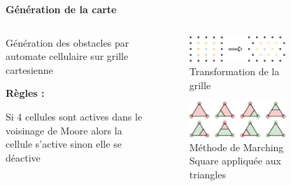 \documentclass[aspectratio=169,10pt]{beamer}
\begin{document}
\begin{frame}{\textbf{Génération de la carte}}
	\begin{columns}[t]
		\begin{column}{0.33\textwidth}

			\vspace{1em}
			Génération des obstacles par automate cellulaire sur grille cartesienne
			\vspace{1em}
			
			\textbf{Règles :}

			\vspace{1em}

			Si 4 cellules sont actives dans le voisinage de Moore alors la cellule s'active sinon elle se déactive
		\end{column}

		\begin{column}{0.33\textwidth}
			\begin{figure}
				\centering
				\includegraphics[width=0.9\textwidth]{IMAGES/grid_transform_map_generation.png}
				\caption{Transformation de la grille}
				\label{fig:map_generation_step3}
			\end{figure}
			\begin{figure}
				\centering
				\includegraphics[width=0.9\textwidth]{IMAGES/marching_square_triangle.png}
				\caption{Méthode de Marching Square appliquée aux triangles}
				\label{fig:map_generation_step1}
			\end{figure}
		\end{column}
		\begin{column}{0.33\textwidth}
			\begin{figure}
				\centering

\end{figure}
\end{column}
\end{columns}
\end{frame}
\end{document}
